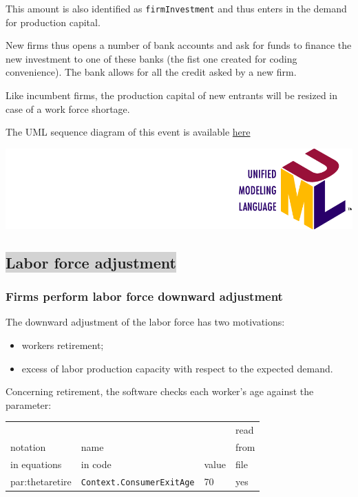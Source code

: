 \documentclass{book}
\newcommand{\doclocation}{file:///Users/giulioni/Documents/workspace/gabriele/docs}
\begin{document}
\vskip3mm
This amount is also identified as \verb+firmInvestment+ and thus enters in the demand for production capital.

New firms thus opens a number of bank accounts and ask for funds to finance the new investment to one of these banks (the fist one created for coding convenience).
The bank allows for all the credit asked by a new firm.

Like incumbent firms, the production capital of new entrants will be resized in case of a work force shortage.

\vskip3mm
The UML sequence diagram of this event is available \href{\doclocation/umldoc/performFirmsEntry.html}{here}
\begin{marginfigure}
	\includegraphics[scale=0.1]{uml.png}
\end{marginfigure}



\subsection*{\colorbox{lightgray}{Labor force adjustment}}

\subsubsection{Firms perform labor force downward adjustment}

The downward adjustment of the labor force has two motivations:
\begin{itemize}
	\item workers retirement;
	\item excess of labor production capacity with respect to the expected demand.
\end{itemize}

Concerning retirement, the software checks each worker's age against the parameter:\\

\vskip2mm
\noindent
\begin{tabular}{l l l l}
	\hline
	& &&read\\
	notation& name &&from\\
	in equations& in code&value&file\\
	\hline
	\hline
	\gls{par:thetaretire}&\verb+Context.ConsumerExitAge+&70&yes\\
	\hline
\end{tabular}
\end{document}

